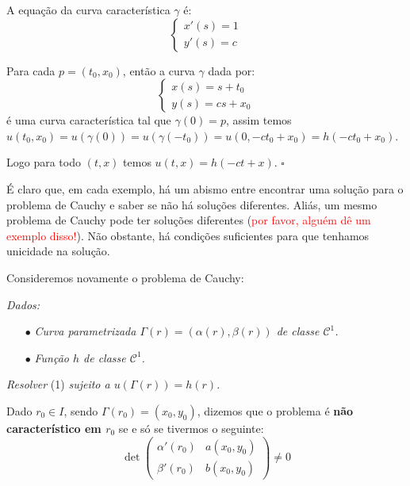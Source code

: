 \documentclass[11pt,twoside,a4paper]{book}
\begin{document}
\smallskip
\noindent
A equação da curva característica $\gamma$ é:
\begin{equation*}
    \begin{cases}
    x'(s)=1       \\
    y'(s)=c     
    \end{cases}
\end{equation*}

\smallskip
\noindent
Para cada $p=(t_0,x_0)$, então a curva $\gamma$ dada por:
\begin{equation*}
    \begin{cases}
    x(s)=s+t_0       \\
    y(s)=cs+x_0      
    \end{cases}
\end{equation*}
é uma curva característica tal que $\gamma(0)=p$, assim temos $u(t_0,x_0)=u(\gamma(0))=u\left(\gamma(-t_0)\right)=u(0,-ct_0+x_0)=h(-ct_0+x_0)$.

\medskip
\noindent
Logo para todo $(t,x)$ temos $u(t,x)=h\left(-ct+x\right)$. $\square$

\bigskip
\noindent
É claro que, em cada exemplo, há um abismo entre encontrar uma solução para o problema de Cauchy e saber se não há soluções diferentes. Aliás, um mesmo problema de Cauchy pode ter soluções diferentes (\textcolor{red}{por favor, alguém dê um exemplo disso!}). Não obstante, há condições suficientes para que tenhamos unicidade na solução.

\bigskip
\noindent
Consideremos novamente o problema de Cauchy:

\smallskip
\noindent
\textit{Dados:}
\begin{enumerate}
    \item[$\bullet$] \textit{Curva parametrizada $\Gamma(r)=(\alpha(r),\beta(r))$ de classe $\mathcal{C}^1$.}
    \item[$\bullet$] \textit{Função $h$ de classe $\mathcal{C}^1$.}
\end{enumerate}

\noindent
\textit{Resolver} (1) \textit{sujeito a $u(\Gamma(r))=h(r)$.}

\bigskip
\noindent
Dado $r_0\in I$, sendo $\Gamma(r_0)=(x_0,y_0)$, dizemos que o problema é \textbf{não característico em $r_0$} se e só se tivermos o seguinte:
\begin{equation*}
    \det
    \begin{pmatrix}
    \alpha'(r_0)&a(x_0,y_0)\\\beta'(r_0)&b(x_0,y_0)
    \end{pmatrix}
    \neq 0
\end{equation*}
\end{document}
